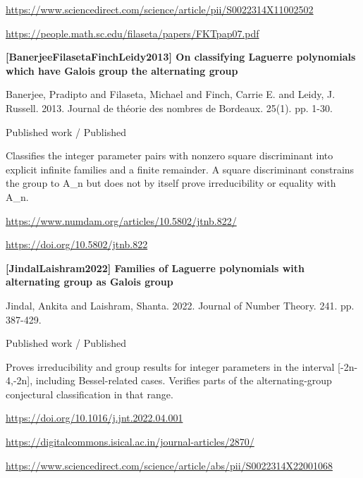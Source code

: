 \documentclass[11pt,a4paper,oneside,openany]{book}
\begin{document}
{\footnotesize\url{https://www.sciencedirect.com/science/article/pii/S0022314X11002502}}\par
{\footnotesize\url{https://people.math.sc.edu/filaseta/papers/FKTpap07.pdf}}\par
\vspace{9pt}
\hypertarget{ref:BanerjeeFilasetaFinchLeidy2013}{}
{\sffamily\bfseries\color{atlasgreen}[BanerjeeFilasetaFinchLeidy2013] On classifying Laguerre polynomials which have Galois group the alternating group}\par
\color{black} Banerjee, Pradipto and Filaseta, Michael and Finch, Carrie E. and Leidy, J. Russell. 2013. Journal de théorie des nombres de Bordeaux. 25(1). pp. 1-30.\par
{\small\sffamily\color{atlasgold}Published work / Published}\par
\color{black} Classifies the integer parameter pairs with nonzero square discriminant into explicit infinite families and a finite remainder. A square discriminant constrains the group to A\_\allowbreak{}n but does not by itself prove irreducibility or equality with A\_\allowbreak{}n.\par
{\footnotesize\url{https://www.numdam.org/articles/10.5802/jtnb.822/}}\par
{\footnotesize\url{https://doi.org/10.5802/jtnb.822}}\par
\vspace{9pt}
\hypertarget{ref:JindalLaishram2022}{}
{\sffamily\bfseries\color{atlasgreen}[JindalLaishram2022] Families of Laguerre polynomials with alternating group as Galois group}\par
\color{black} Jindal, Ankita and Laishram, Shanta. 2022. Journal of Number Theory. 241. pp. 387-429.\par
{\small\sffamily\color{atlasgold}Published work / Published}\par
\color{black} Proves irreducibility and group results for integer parameters in the interval [-2n-4,-2n], including Bessel-related cases. Verifies parts of the alternating-group conjectural classification in that range.\par
{\footnotesize\url{https://doi.org/10.1016/j.jnt.2022.04.001}}\par
{\footnotesize\url{https://digitalcommons.isical.ac.in/journal-articles/2870/}}\par
{\footnotesize\url{https://www.sciencedirect.com/science/article/abs/pii/S0022314X22001068}}\par
\end{document}
